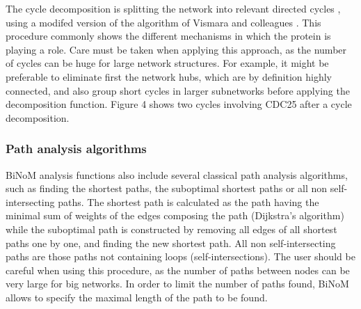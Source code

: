 \documentclass[10pt]{bmc_article}
\newenvironment{bmcformat}{\baselineskip20pt\sloppy\setboolean{publ}{false}}{\baselineskip20pt\sloppy}
\begin{document}
\begin{bmcformat}


The cycle decomposition is splitting the network into relevant directed cycles
\cite{gleiss2001relevant}, using a modifed version of the algorithm of Vismara
and colleagues \cite{vismara1997union}. This procedure commonly shows the
different mechanisms in which the protein is playing a role. Care must
be taken when applying this approach, as the number of cycles can be huge for
large network structures. For example, it might be preferable to eliminate first
the network hubs, which are by definition highly connected, and also group short
cycles in larger subnetworks before applying the decomposition function.
Figure 4 shows two
cycles involving CDC25 after a cycle decomposition.


\subsubsection*{Path analysis algorithms}

BiNoM analysis functions also include several classical path analysis
algorithms, such as finding the shortest paths, the suboptimal shortest paths or
all non self-intersecting paths. The shortest path is calculated as the path having
the minimal sum of weights of the edges composing the path (Dijkstra's
algorithm) while the suboptimal path is constructed by removing all edges of
all shortest paths one by one, and finding the new shortest path. All non self-intersecting paths 
are those paths not containing loops (self-intersections). 
The user should be careful when using this procedure, as the number of paths between nodes can be
very large for big networks. In order to limit the number of paths found, BiNoM
allows to specify the maximal length of the path to be found.


\end{bmcformat}
\end{document}
